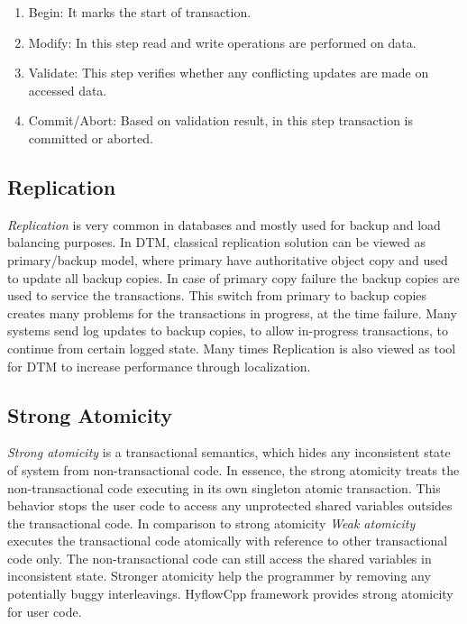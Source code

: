 \documentclass[12pt,english]{report}
\begin{document}
\begin{enumerate}
\item Begin: It marks the start of transaction.
\item Modify: In this step read and write operations are performed on data.
\item Validate: This step verifies whether any conflicting updates are made on accessed data.
\item Commit/Abort: Based on validation result, in this step transaction is committed or aborted.
\end{enumerate}   

\subsection{Replication}

\textit{Replication} is very common in databases and mostly used for backup and load balancing purposes. In DTM, classical replication solution can be viewed as primary/backup model, where primary have authoritative object copy and used to update all backup copies. In case of primary copy failure the backup copies are used to service the transactions. This switch from primary to backup copies creates many problems for the transactions in progress, at the time failure. Many systems send log updates to backup copies, to allow in-progress transactions, to continue from certain logged state. Many times Replication is also viewed as tool for DTM to increase performance through localization.

\subsection{Strong Atomicity}

\textit{Strong atomicity} is a transactional semantics, which hides any inconsistent state of system from non-transactional code. In essence, the strong atomicity treats the non-transactional code executing in its own singleton atomic transaction. This behavior stops the user code to access any unprotected shared variables outsides the transactional code. In comparison to strong atomicity \textit{ Weak atomicity} executes the transactional code atomically with reference to other transactional code only. The non-transactional code can still access the shared variables in inconsistent state. Stronger atomicity help the programmer by removing any potentially buggy interleavings. HyflowCpp framework provides strong atomicity for user code.     
\end{document}
